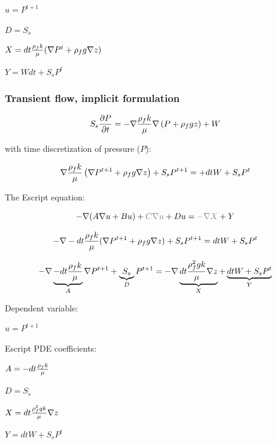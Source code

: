 \documentclass[11pt]{article}
\begin{document}
$u = P^{t+1}$

$D = S_s$

$X  = dt  {\rho_f k \over{\mu}} ( \nabla  P^{t}  + \rho_f g \nabla z) $

$Y = W dt + S_s P^{t} $






\subsubsection{Transient flow, implicit formulation}

\begin{equation}
	 S_s { \partial P \over {\partial t} } = - \nabla { \rho_f k \over{\mu} } \nabla  \left( P + \rho_f g z \right) + W
\end{equation}

with time discretization of pressure ($P$):

\begin{equation}
	 \nabla { \rho_f k \over{\mu} } \left( \nabla P^{t+1} + \rho_f g \nabla z \right) + S_s P^{t+1} = + dt W + S_s P^t 
\end{equation}


The Escript equation:

\begin{equation}
    - \nabla (A \nabla u + B u ) + {\color{gray} C \nabla u }  + D u  = {\color{gray}- \nabla X } + Y
\end{equation}

\begin{equation}
	 -\nabla - dt { \rho_f k \over{\mu} } ( \nabla  P^{t+1} + \rho_f g \nabla z ) + S_s P^{t+1} = dt W + S_s P^t 
\end{equation}

\begin{equation}
	 -\nabla \underbrace{ - dt { \rho_f k \over{\mu} } }_A \nabla  P^{t+1} + \underbrace{ S_s }_D P^{t+1} = -\nabla \underbrace{ dt { \rho_f^2 g k \over{\mu} } \nabla z }_X + \underbrace{ dt W + S_s P^t }_Y 
\end{equation}

Dependent variable:

$u = P^{t+1} $

Escript PDE coefficients:

$ A = - dt { \rho_f k \over{\mu} } $

$ D =  S_s $

$ X = dt { \rho_f^2 g k \over{\mu} } \nabla z $

$ Y = dt W + S_s P^t  $
\end{document}
